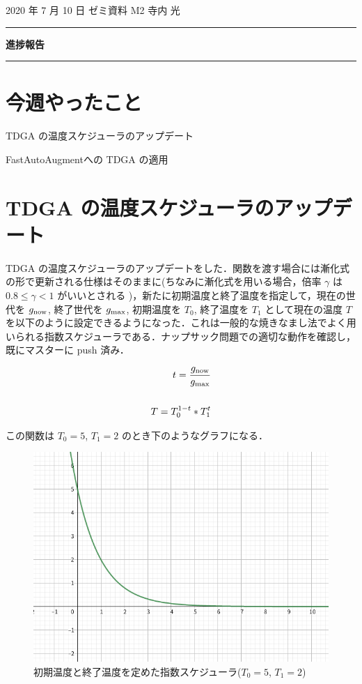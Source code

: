 \documentclass[onecolumn]{ujarticle}   %
\begin{document}
	\noindent

	\hspace{1em}
	2020 年 7 月 10 日
	ゼミ資料
	\hfill
	M2 寺内 光

	\vspace{2mm}

	\hrule

	\begin{center}
		{\Large \bf 進捗報告}
	\end{center}

	\hrule
	\vspace{3mm}

	\section{今週やったこと}
	\begin{itemize}{
    \item{TDGA の温度スケジューラのアップデート}
		\item{FastAutoAugmentへの TDGA の適用}
	}\end{itemize}
	\section{TDGA の温度スケジューラのアップデート}
  TDGA の温度スケジューラのアップデートをした．関数を渡す場合には漸化式の形で更新される仕様はそのままに(ちなみに漸化式を用いる場合，倍率 $\gamma$ は $0.8 \leq \gamma < 1$ がいいとされる \cite{SAschedule})，新たに初期温度と終了温度を指定して，現在の世代を $g_{\rm{now}}$, 終了世代を $g_{\rm{max}}$, 初期温度を $T_0$, 終了温度を $T_1$ として現在の温度 $T$ を以下のように設定できるようになった．これは一般的な焼きなまし法でよく用いられる指数スケジューラである．ナップサック問題での適切な動作を確認し，既にマスターに push 済み．

  \begin{eqnarray*}
    t = \frac{g_{\rm{now}}}{g_{\rm{max}}} \\ \\
    T = T_0^{1-t} * T_1^{t}
  \end{eqnarray*}

  この関数は $T_0 = 5$, $T_1 = 2$ のとき下のようなグラフになる．
  \begin{figure}[h]
		\begin{center}
			\includegraphics[width=0.7\columnwidth]{TGraph.png}
			\caption{初期温度と終了温度を定めた指数スケジューラ($T_0 = 5$, $T_1 = 2$)}
			\label{fig:variousmute}
		\end{center}
	\end{figure}
\end{document}
